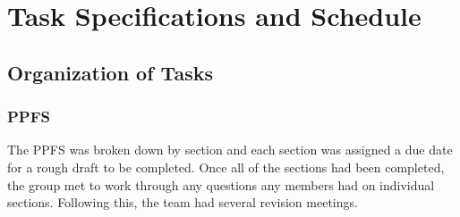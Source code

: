 \documentclass[PPFS.tex]{template/subfiles}
\begin{document}
\begin{comment}
These are the requirements as stated in the template given by Profess M.

    Detailed task specifications are a key part of your design.  Tasks that take more than a day or two should be broken down into sub-tasks whenever possible.  Typically tasks specs and schedule are combined since they are intimately related.  The percentage complete on each task should be included in the PPFS.  Address any issues related to tasks that are behind schedule in the project management section.  Organize tasks hierarchically, such as system architecture, mechanical, electrical (hardware, software), etc.  Provide block diagrams to help explain how you divided the project into various phases/parts/categories.  
    Many teams make the mistake of thinking the prototype is the design.  This is rarely the case.  Only a few teams produce a single device.  Most are designing a product that can be mass produced.  Thus the prototype is your method of validating your production design.   It is a major test or validation activity on the way to completing the design.  Include prototyping activities as tasks that help you finish the production design.  
    Summarize your schedule by reporting the total expected person-hours needed to complete the design.  The best reports track the schedule progress by reporting the month by month estimate of total person-hours and graphing how it changed as you gained experience.
\end{comment}

\section{Task Specifications and Schedule}

\subsection{Organization of Tasks}

\subsubsection{PPFS}
The PPFS was broken down by section and each section was assigned a due date for a rough draft to be completed. Once all of the sections had been completed, the group met to work through any questions any members had on individual sections. Following this, the team had several revision meetings.
\end{document}
